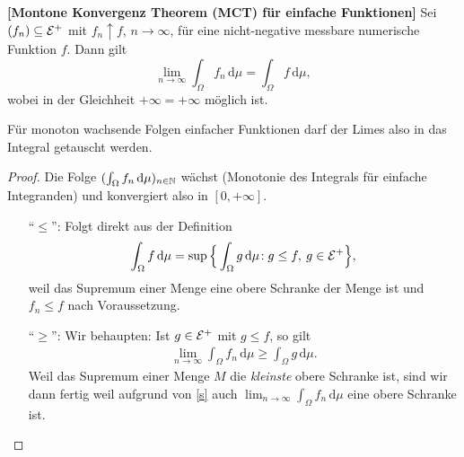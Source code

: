 \begin{lemma}\label{monKonv}
\textbf{[Montone Konvergenz Theorem (MCT) für einfache Funktionen]}
	Sei $(f_n) \subseteq \mathcal{E}^+$ mit $f_n \uparrow f$, $n \to \infty$, für eine nicht-negative messbare numerische Funktion $f$. Dann gilt
	\[ \lim_{n \to \infty} \int_{\Omega} f_n \, \mathrm{d}\mu = \int_{\Omega} f \, \mathrm{d}\mu, \]
	wobei in der Gleichheit $ + \infty = + \infty$ m\"oglich ist. 
\end{lemma}
F\"ur monoton wachsende Folgen einfacher Funktionen darf der Limes also in das Integral getauscht werden.
\begin{proof}
	Die Folge $(\int_{\Omega} f_n \, \mathrm{d}\mu)_{n \in \mathbb{N}}$ wächst (Monotonie des Integrals f\"ur einfache Integranden) und konvergiert also in $[0, +\infty]$.
	\begin{itemize}
		\item [\enquote{$\leq$}:] Folgt direkt aus der Definition \[ \int_{\Omega} f \,\mathrm{d}\mu = \sup \Big\{ \int_{\Omega} g\, \mathrm{d}\mu \! : g \leq f, \: g \in \mathcal{E}^+ \Big\},\]
		weil das Supremum einer Menge eine obere Schranke der Menge ist und $f_n\leq f$ nach Voraussetzung.
		\item [\enquote{$\geq$}:] Wir behaupten: Ist $ g \in \mathcal{E}^+$ mit $ g \leq f$, so gilt
		\begin{align}\label{s}
			\lim_{n \to \infty} \int_{\Omega} f_n \,\mathrm{d}\mu \geq \int_{\Omega} g \,\mathrm{d}\mu.
		\end{align}
		 Weil das Supremum einer Menge $M$ die \textit{kleinste} obere Schranke ist, sind wir dann fertig weil aufgrund von \eqref{s} auch $\lim_{n \to \infty} \int_{\Omega} f_n \,\mathrm{d}\mu$ eine obere Schranke ist.\smallskip
		

\end{itemize}
\end{proof}
